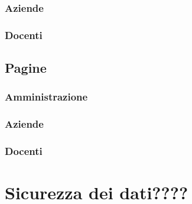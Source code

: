 \documentclass{article}
\begin{document}
\subsubsection{Aziende}
\subsubsection{Docenti}

\subsection{Pagine}
\subsubsection{Amministrazione}
\subsubsection{Aziende}
\subsubsection{Docenti}

\section{Sicurezza dei dati????}
\end{document}
